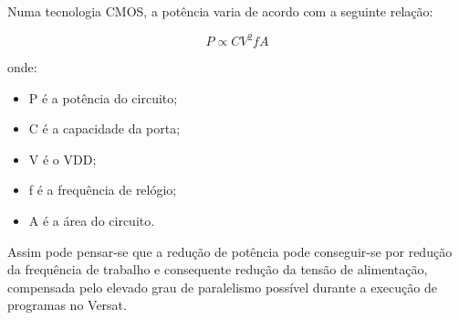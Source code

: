 Numa tecnologia CMOS, a potência varia de acordo com a seguinte relação: 

\begin{equation} P \propto CV^{2}fA \end{equation}

onde:
\begin{itemize}
  \item P é a potência do circuito;
  \item C é a capacidade da porta;
  \item V é o VDD;
  \item f é a frequência de relógio;
  \item A é a área do circuito.
\end{itemize}

Assim pode pensar-se que a redução de potência pode conseguir-se por redução da frequência de trabalho e consequente redução da tensão de alimentação,
compensada pelo elevado grau de paralelismo possível durante a execução de programas no Versat.






